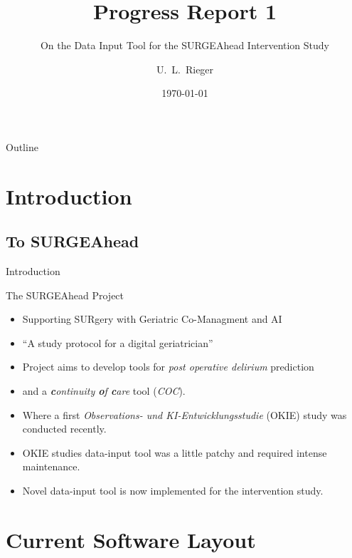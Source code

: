 \documentclass{beamer}
\title{Progress Report 1}
\subtitle{On the Data Input Tool for the SURGEAhead Intervention Study}
\author{U.~L.~Rieger}
\institute{Medical Systems Biology Group \\ Uni Ulm}
\date{\today}
\begin{document}
\begin{frame}[t]
    \maketitle
\end{frame}

\begin{frame}[t]{Outline}
       \tableofcontents
\end{frame}

\section{Introduction}
\subsection{To SURGEAhead}%
\label{sub:To SU}

\begin{frame}{Introduction}
    \begin{block}{The SURGEAhead Project}
        \begin{itemize}
            \item Supporting SURgery with Geriatric Co-Managment and AI
            \item ``A study protocol for a digital geriatrician'' \cite{Leinert2023}
            \item Project aims to develop tools for \textit{post operative delirium} prediction 
            \item and a \textit{\textbf{c}ontinuity \textbf{o}f \textbf{c}are} tool (\textit{COC}).
            \item Where a first \textit{Observations- und KI-Entwicklungsstudie} (OKIE) study was conducted recently.
            \item OKIE studies data-input tool was a little patchy and required intense maintenance.
            \item Novel data-input tool is now implemented for the intervention study.
        \end{itemize}
    \end{block}
\end{frame}

\section{Current Software Layout}%
\label{sec:Current Software Layout}
\end{document}
